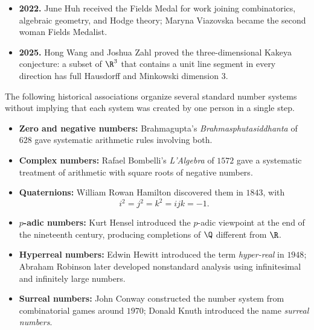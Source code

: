 \begin{itemize}
              $E_8$ lattice sphere packing in dimension $8$; joint work soon
              settled dimension $24$ using the Leech lattice.
        \item \textbf{2022.} June Huh received the Fields Medal for work joining
              combinatorics, algebraic geometry, and Hodge theory; Maryna
              Viazovska became the second woman Fields Medalist.
        \item \textbf{2025.} Hong Wang and Joshua Zahl proved the
              three-dimensional Kakeya conjecture: a subset of $\R^3$ that
              contains a unit line segment in every direction has full
              Hausdorff and Minkowski dimension $3$.
    \end{itemize}


    \begin{fact}
        The following historical associations organize several standard number
        systems without implying that each system was created by one person in
        a single step.
        \begin{itemize}
            \item \textbf{Zero and negative numbers:} Brahmagupta's
                  \textit{Brahmasphutasiddhanta} of $628$ gave systematic
                  arithmetic rules involving both.
            \item \textbf{Complex numbers:} Rafael Bombelli's
                  \textit{L'Algebra} of $1572$ gave a systematic treatment of
                  arithmetic with square roots of negative numbers.
            \item \textbf{Quaternions:} William Rowan Hamilton discovered them
                  in $1843$, with
                  \[
                      i^2=j^2=k^2=ijk=-1.
                  \]
            \item \textbf{$p$-adic numbers:} Kurt Hensel introduced the
                  $p$-adic viewpoint at the end of the nineteenth century,
                  producing completions of $\Q$ different from $\R$.
            \item \textbf{Hyperreal numbers:} Edwin Hewitt introduced the term
                  \emph{hyper-real} in $1948$; Abraham Robinson later developed
                  nonstandard analysis using infinitesimal and infinitely large
                  numbers.
            \item \textbf{Surreal numbers:} John Conway constructed the number
                  system from combinatorial games around $1970$; Donald Knuth
                  introduced the name \emph{surreal numbers}.
        \end{itemize}
    \end{fact}

